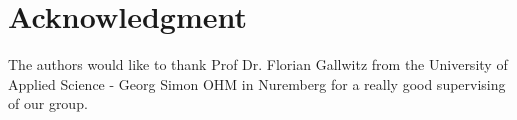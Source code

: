 \documentclass[journal]{IEEEtran}
\begin{document}
\section*{Acknowledgment}
\noindent The authors would like to thank Prof Dr. Florian Gallwitz from the University of Applied Science - Georg Simon OHM in Nuremberg for a really good supervising of our group. 




%




\end{document}
